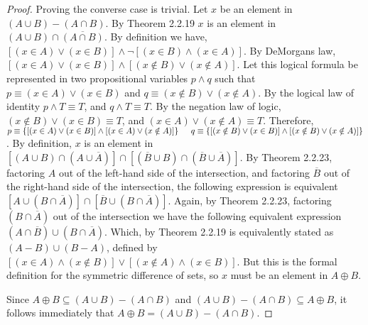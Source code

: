\documentclass[a4paper, 12pt]{article}
\theoremstyle{plain}
\begin{document}
\begin{proof}
		Proving the converse case is trivial. Let $x$ be an element in \newline $(A \cup B) - (A \cap B)$. By Theorem 2.2.19 $x$ is an element in $(A \cup B) \cap \overline{(A \cap B)}$. By definition we have, $[(x \in A) \lor (x \in B)] \land \lnot [(x \in B) \land (x \in A)]$. By DeMorgans law, $[(x \in A) \lor (x \in B)] \land [(x \notin B) \lor (x \notin A)]$. Let this logical formula be represented in two propositional variables $p \land q$ such that $p \equiv (x \in A) \lor (x \in B)$ and $q \equiv (x \notin B) \lor (x \notin A)$. By the logical law of identity $p \land T \equiv T$, and $q \land T \equiv T$. By the negation law of logic, $(x \notin B) \lor (x \in B) \equiv T$, and $(x \in A) \lor (x \notin A) \equiv T$. Therefore, \newline \indent $p \equiv \{[(x \in A) \lor (x \in B)] \land [(x \in A) \lor (x \notin A)]\} \newline \indent q \equiv \{[(x \notin B) \lor (x \in B)] \land [(x \notin B) \lor (x \notin A)]\}$. \newline By definition, $x$ is an element in $[(A \cup B) \cap (A \cup \overline{A})] \cap [(\overline{B} \cup B) \cap (\overline{B} \cup \overline{A})]$. By Theorem 2.2.23, factoring $A$ out of the left-hand side of the intersection, and factoring $\overline{B}$ out of the right-hand side of the intersection, the following expression is equivalent $[A \cup (B \cap \overline{A})] \cap [\overline{B} \cup (B \cap \overline{A})]$. Again, by Theorem 2.2.23, factoring $(B \cap \overline{A})$ out of the intersection we have the following equivalent expression $(A \cap \overline{B}) \cup (B \cap \overline{A})$. Which, by Theorem 2.2.19 is equivalently stated as $(A - B) \cup (B - A)$, defined by $[(x \in A) \land (x \notin B)] \lor [(x \notin A) \land (x \in B)]$. But this is the formal definition for the symmetric difference of sets, so $x$ must be an element in $A \oplus B$.
		
		Since $A \oplus B \subseteq (A \cup B) - (A \cap B)$ and $(A \cup B) - (A \cap B) \subseteq A \oplus B$, it follows immediately that $A \oplus B = (A \cup B) - (A \cap B)$.
	\end{proof}
\end{document}

